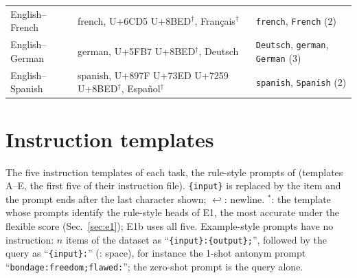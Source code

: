 \begin{center}
\begin{tabular}{@{}l>{\raggedright}p{}>{\raggedright\arraybackslash}p{}@{}}
English--French & french, \textrm{U+6CD5} \textrm{U+8BED}$^\dagger$, Français$^\dagger$ & \texttt{\textvisiblespace{}french}, \texttt{French} (2) \\[2pt]
English--German & german, \textrm{U+5FB7} \textrm{U+8BED}$^\dagger$, Deutsch & \texttt{\textvisiblespace{}Deutsch}, \texttt{\textvisiblespace{}german}, \texttt{German} (3) \\[2pt]
English--Spanish & spanish, \textrm{U+897F} \textrm{U+73ED} \textrm{U+7259} \textrm{U+8BED}$^\dagger$, Español$^\dagger$ & \texttt{\textvisiblespace{}spanish}, \texttt{Spanish} (2) \\[2pt]
\bottomrule
\end{tabular}
\end{center}

\section{Instruction templates}\label{app:templates-simple}
\begin{sloppypar}The five instruction templates of each task, the rule-style prompts of \citet[App.~A.3.1]{yang2026shared} (templates A--E, the first five of their instruction file). \texttt{\{input\}} is replaced by the item and the prompt ends after the last character shown; $\hookleftarrow$: newline. $^\ast$: the template whose prompts identify the rule-style heads of E1, the most accurate under the flexible score (Sec.~\ref{sec:e1}); E1b uses all five. Example-style prompts have no instruction: $n$ items of the dataset as ``\texttt{\textvisiblespace\{input\}:\textvisiblespace\{output\};}'', followed by the query as ``\texttt{\textvisiblespace\{input\}:}'' (\textvisiblespace: space), for instance the 1-shot antonym prompt ``\texttt{\textvisiblespace{}bondage:\textvisiblespace{}freedom;\textvisiblespace{}flawed:}''; the zero-shot prompt is the query alone.\end{sloppypar}

